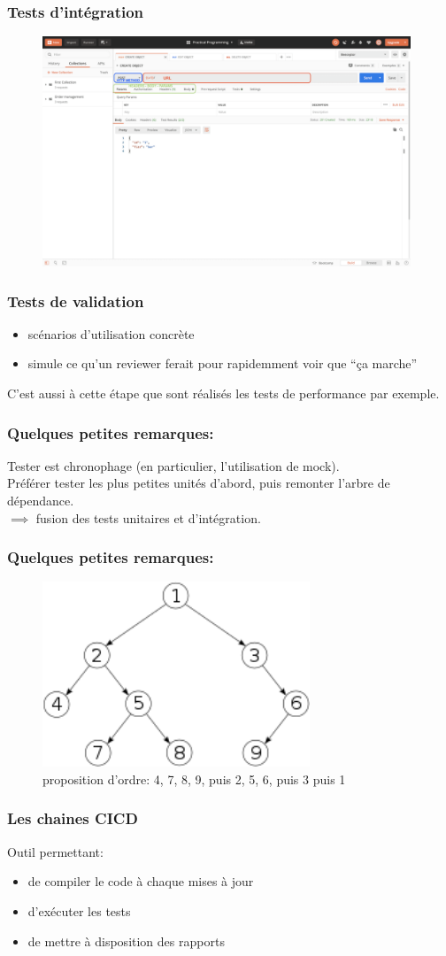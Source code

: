 \documentclass{beamer}
\begin{document}
\begin{frame}
    \frametitle{Tests d'intégration}
    \begin{figure}
        \includegraphics[width=11cm]{img/postman.png}
    \end{figure}
\end{frame}

\begin{frame}
    \frametitle{Tests de validation}
    \begin{itemize}
        \item scénarios d'utilisation concrète
        \item simule ce qu'un reviewer ferait pour rapidemment voir que ``ça marche''
    \end{itemize}
    C'est aussi à cette étape que sont réalisés les tests de performance par exemple.
\end{frame}

\begin{frame}
    \frametitle{Quelques petites remarques:}
    Tester est chronophage (en particulier, l'utilisation de mock).\\
    Préférer tester les plus petites unités d'abord, puis remonter l'arbre de dépendance.\\
    $\implies$ fusion des tests unitaires et d'intégration.
\end{frame}

\begin{frame}
    \frametitle{Quelques petites remarques:}
    \begin{figure}
        \includegraphics[width=8cm]{img/arbre_dep.png}
        \caption{proposition d'ordre: {4, 7, 8, 9}, puis {2, 5, 6}, puis 3 puis 1}
    \end{figure}
\end{frame}

\begin{frame}
    \frametitle{Les chaines CICD}
    Outil permettant:
    \begin{itemize}
        \item de compiler le code à chaque mises à jour
        \item d'exécuter les tests
        \item de mettre à disposition des rapports
    \end{itemize}
\end{frame}
\end{document}
